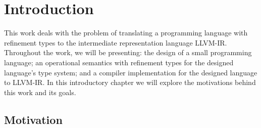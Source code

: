 \documentclass[
  english,
  lmodern,
  oneside
]{ufsc-thesis-rn46-2019/ufsc-thesis-rn46-2019}
\begin{document}

\tableofcontents*

\textual%

\chapter{Introduction}\label{chapter:introduction}

This work deals with the problem of translating a programming language with refinement types to the intermediate representation language LLVM-IR.\@
Throughout the work, we will be presenting: the design of a small programming language; an operational semantics with refinement types for the designed language's type system; and a compiler implementation for the designed language to LLVM-IR.\@
In this introductory chapter we will explore the motivations behind this work and its goals.

\section{Motivation}\label{chapter:introduction:sec:motivation}
\end{document}
